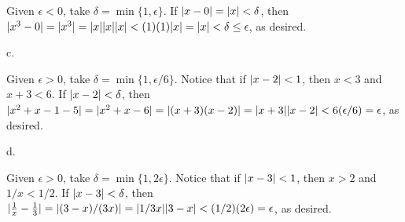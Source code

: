 Given $\epsilon < 0$, take $\delta = \min \{1, \epsilon\}$.
If $\vert x - 0\vert = \vert x\vert < \delta$, then
$\vert x^3 - 0\vert = \vert x^3\vert = \vert x\vert \vert x\vert \vert x\vert < (1) (1) \vert x\vert = \vert x\vert <
\delta \le \epsilon$, as desired.
\medskip
\item{} c.

Given $\epsilon > 0$, take $\delta = \min \{1, \epsilon / 6\}$.
Notice that if $\vert x - 2\vert < 1$, then $x < 3$ and $x + 3 < 6$.
If $\vert x - 2\vert < \delta$, then
$\vert x^2 + x - 1 - 5\vert = \vert x^2 + x - 6\vert = \vert(x + 3)(x - 2)\vert =
\vert x + 3\vert \vert x - 2\vert < 6 (\epsilon / 6) = \epsilon$, as desired.
\medskip
\item{} d.

Given $\epsilon > 0$, take $\delta = \min \{1, 2 \epsilon\}$.
Notice that if $\vert x - 3\vert < 1$, then $x > 2$ and $1/x < 1/2$.
If $\vert x - 3\vert < \delta$, then
$\vert{1 \over x} - {1 \over 3}\vert = \vert(3 - x) / (3x)\vert =
\vert1/3x\vert \vert3 - x\vert < (1/2) (2 \epsilon) = \epsilon$, as desired.
\bye
